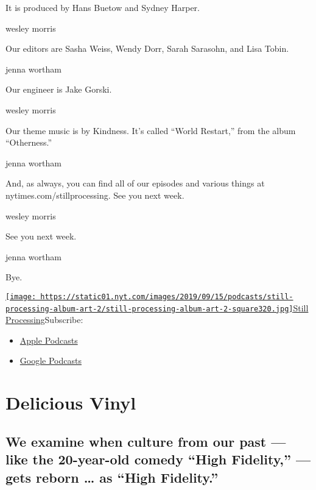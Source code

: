 It is produced by Hans Buetow and Sydney Harper.

wesley morris

Our editors are Sasha Weiss, Wendy Dorr, Sarah Sarasohn, and Lisa Tobin.

jenna wortham

Our engineer is Jake Gorski.

wesley morris

Our theme music is by Kindness. It's called ``World Restart,'' from the
album ``Otherness.''

jenna wortham

And, as always, you can find all of our episodes and various things at
nytimes.com/stillprocessing. See you next week.

wesley morris

See you next week.

jenna wortham

Bye.

\href{https://www.nytimes.com/column/still-processing-podcast}{\texttt{[image: https://static01.nyt.com/images/2019/09/15/podcasts/still-processing-album-art-2/still-processing-album-art-2-square320.jpg]}Still
Processing}Subscribe:

\begin{itemize}
\tightlist
\item
  \href{https://itunes.apple.com/us/podcast/id1151436460}{Apple
  Podcasts}
\item
  \href{https://www.google.com/podcasts?feed=aHR0cHM6Ly9yc3MuYXJ0MTkuY29tL255dC1zdGlsbC1wcm9jZXNzaW5n}{Google
  Podcasts}
\end{itemize}

\hypertarget{delicious-vinyl-1}{%
\section{Delicious Vinyl}\label{delicious-vinyl-1}}

\hypertarget{we-examine-when-culture-from-our-past--like-the-20-year-old-comedy-high-fidelity--gets-reborn--as-high-fidelity-1}{%
\subsection{We examine when culture from our past --- like the
20-year-old comedy ``High Fidelity,'' --- gets reborn \ldots{} as ``High
Fidelity.''}\label{we-examine-when-culture-from-our-past--like-the-20-year-old-comedy-high-fidelity--gets-reborn--as-high-fidelity-1}}

